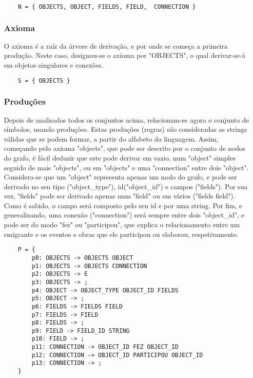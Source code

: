 \documentclass[a4paper]{article}
\begin{document}
\bigskip

\begin{lstlisting}
    N = { OBJECTS, OBJECT, FIELDS, FIELD,  CONNECTION }
\end{lstlisting}

\subsubsection{Axioma}
\label{sec:3.2.3}
\hspace{3.5mm} O axioma é a raíz da árvore de derivação, e por onde se começa a primeira produção. Neste caso, designou-se o axioma por "OBJECTS", o qual derivar-se-á em objetos singulares e conexões.

\bigskip

\begin{lstlisting}
    S = { OBJECTS }
\end{lstlisting}


\subsubsection{Produções}
\label{sec:3.2.4}
\hspace{3.5mm} Depois de analisados todos os conjuntos acima, relacionam-se agora o conjunto de símbolos, usando produções. Estas produções (regras) são consideradas as strings válidas que se podem formar, a partir do alfabeto da linguagem. Assim, começando pelo axioma "objects", que pode ser descrito por o conjunto de nodos do grafo, é fácil deduzir que este pode derivar em vazio, num "object" simples seguido de mais "objects", ou em "objects" e uma "connection" entre dois "object". Considera-se que um "object" representa apenas um nodo do grafo, e pode ser derivado no seu tipo ("object\_type"), id("object\_id") e campos ("fields"). Por sua vez, "fields" pode ser derivado apenas num "field" ou em vários ("fields field"). Como é sabido, o campo será composto pelo seu id e por uma string. Por fim, e generalizando, uma conexão ("connection") será sempre entre dois "object\_id", e pode ser do modo "fez" ou "participou", que explica o relacionamento entre um emigrante e os eventos e obras que ele participou ou elaborou, respetivamente.
\bigskip

\begin{lstlisting}
    P = {
        p0: OBJECTS -> OBJECTS OBJECT
        p1: OBJECTS -> OBJECTS CONNECTION
        p2: OBJECTS -> E
        p3: OBJECTS -> ;
        p4: OBJECT -> OBJECT_TYPE OBJECT_ID FIELDS
        p5: OBJECT -> ;
        p6: FIELDS -> FIELDS FIELD
        p7: FIELDS -> FIELD
        p8: FIELDS -> ;
        p9: FIELD -> FIELD_ID STRING
        p10: FIELD -> ;
        p11: CONNECTION -> OBJECT_ID FEZ OBJECT_ID
        p12: CONNECTION -> OBJECT_ID PARTICIPOU OBJECT_ID
        p13: CONNECTION -> ;
    }
\end{lstlisting}
\end{document}
